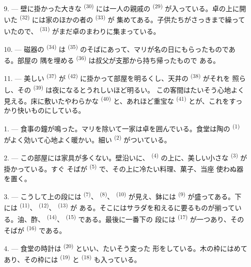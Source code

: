 9. --- 壁に掛かった大きな \textsuperscript{(30)} には一人の親戚の
 \textsuperscript{(29)} が入っている。卓の上に開いた
\textsuperscript{(32)} には家のほかの者の \textsuperscript{(33)} が
集めてある。子供たちがさっきまで繰っていたので、
\textsuperscript{(31)} がまだ卓のまわりに集まっている。

10. --- 磁器の \textsuperscript{(34)} は
\textsuperscript{(35)} のそばにあって、マリが名の日にもらったものである。部屋の
隅を埋める \textsuperscript{(36)} は叔父が支那から持ち帰ったもので
ある。

11. --- 美しい \textsuperscript{(37)} が \textsuperscript{(42)}
に掛かって部屋を明るくし、天井の \textsuperscript{(38)} がそれを
照らし、その \textsuperscript{(39)} は夜になるとうれしいほど明るい。
この客間はたいそう心地よく見える。床に敷いたやわらかな
\textsuperscript{(40)} と、あれほど重宝な \textsuperscript{(41)}
とが、これをすっかり快いものにしている。

\VUsaut{3.6mm}
\VUsaut{3.0mm}

1. --- 食事の鐘が鳴った。マリを除いて一家は卓を囲んでいる。食堂は陶の
 \textsuperscript{(1)} がよく効いて心地よく暖かい。細い
\textsuperscript{(2)} がついている。

2. --- この部屋には家具が多くない。壁沿いに、 \textsuperscript{(4)}
の上に、美しい小さな \textsuperscript{(3)} が掛かっている。すぐ
そばが \textsuperscript{(5)} で、その上に冷たい料理、菓子、当座
使わぬ器を置く。

3. --- こうして上の段には \textsuperscript{(7)}、
\textsuperscript{(8)}、 \textsuperscript{(10)} が見え、鉢には
 \textsuperscript{(9)} が盛ってある。下には \textsuperscript{(11)}、
 \textsuperscript{(12)}、 \textsuperscript{(13)} が
ある。そこにはサラダを和えるに要るものが揃っている。油、酢、
\textsuperscript{(14)}、 \textsuperscript{(15)} である。最後に一番下の
段には \textsuperscript{(17)} が一つあり、そのそばが
 \textsuperscript{(16)} である。

4. --- 食堂の時計は \textsuperscript{(20)} といい、たいそう変った
形をしている。木の枠にはめてあり、その枠には \textsuperscript{(19)}
と \textsuperscript{(18)} も入っている。

